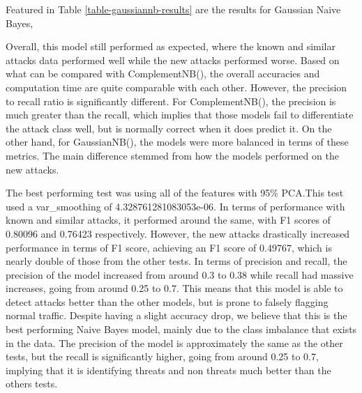 Featured in Table \ref{table-gaussiannb-results} are the results for Gaussian Naive Bayes,


Overall, this model still performed as expected, where the known and similar attacks data performed well while the new attacks performed worse. Based on what can be compared with ComplementNB(), the overall accuracies and computation time are quite comparable with each other. However, the precision to recall ratio is significantly different. For ComplementNB(), the precision is much greater than the recall, which implies that those models fail to differentiate the attack class well, but is normally correct when it does predict it. On the other hand, for GaussianNB(), the models were more balanced in terms of these metrics. The main difference stemmed from how the models performed on the new attacks.

The best performing test was using all of the features with 95\% PCA.This test used a var\_smoothing of 4.328761281083053e-06. In terms of performance with known and similar attacks, it performed around the same, with F1 scores of 0.80096 and 0.76423 respectively. However, the new attacks drastically increased performance in terms of F1 score, achieving an F1 score of 0.49767, which is nearly double of those from the other tests. In terms of precision and recall, the precision of the model increased from around 0.3 to 0.38 while recall had massive increases, going from around 0.25 to 0.7. This means that this model is able to detect attacks better than the other models, but is prone to falsely flagging normal traffic. Despite having a slight accuracy drop, we believe that this is the best performing Naive Bayes model, mainly due to the class imbalance that exists in the data. The precision of the model is approximately the same as the other tests, but the recall is significantly higher, going from around 0.25 to 0.7, implying that it is identifying threats and non threats much better than the others tests.

